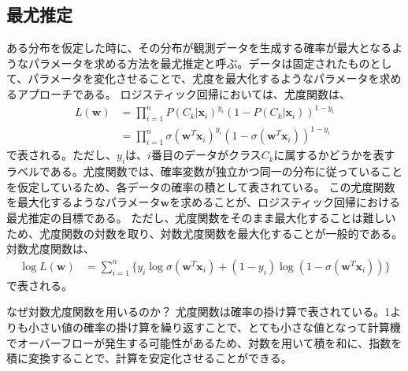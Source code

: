 \documentclass{ltjsarticle}
\begin{document}
\subsection{最尤推定}
ある分布を仮定した時に、その分布が観測データを生成する確率が最大となるようなパラメータを求める方法を最尤推定と呼ぶ。データは固定されたものとして、パラメータを変化させることで、尤度を最大化するようなパラメータを求めるアプローチである。
ロジスティック回帰においては、尤度関数は、
\begin{align}
  L(\boldsymbol{w}) &= \prod_{i=1}^{n}P(C_k|\boldsymbol{x}_i)^{y_i}(1-P(C_k|\boldsymbol{x}_i))^{1-y_i} \\
&= \prod_{i=1}^{n}\sigma(\boldsymbol{w}^T\boldsymbol{x}_i)^{y_i}(1-\sigma(\boldsymbol{w}^T\boldsymbol{x}_i))^{1-y_i}  
\end{align}
で表される。ただし、$y_i$は、$i$番目のデータがクラス$C_k$に属するかどうかを表すラベルである。尤度関数では、確率変数が独立かつ同一の分布に従っていることを仮定しているため、各データの確率の積として表されている。
この尤度関数を最大化するようなパラメータ$\boldsymbol{w}$を求めることが、ロジスティック回帰における最尤推定の目標である。
ただし、尤度関数をそのまま最大化することは難しいため、尤度関数の対数を取り、対数尤度関数を最大化することが一般的である。
対数尤度関数は、
\begin{align}
  \log L(\boldsymbol{w}) &= \sum_{i=1}^{n}\{y_i\log \sigma(\boldsymbol{w}^T\boldsymbol{x}_i) + (1-y_i)\log(1-\sigma(\boldsymbol{w}^T\boldsymbol{x}_i))\}
\end{align}
で表される。
\begin{itembox}[l]{なぜ対数尤度関数を用いるのか？}
  尤度関数は確率の掛け算で表されている。1よりも小さい値の確率の掛け算を繰り返すことで、とても小さな値となって計算機でオーバーフローが発生する可能性があるため、対数を用いて積を和に、指数を積に変換することで、計算を安定化させることができる。
\end{itembox}
\end{document}
